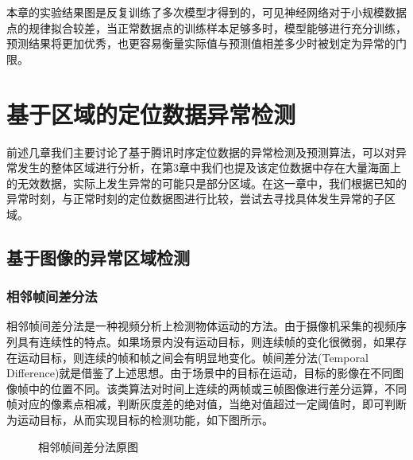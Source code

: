 \documentclass[a4paper,AutoFakeBold,oneside,12pt]{book}
\begin{document}
{{

	本章的实验结果图是反复训练了多次模型才得到的，可见神经网络对于小规模数据点的规律拟合较差，当正常数据点的训练样本足够多时，模型能够进行充分训练，预测结果将更加优秀，也更容易衡量实际值与预测值相差多少时被划定为异常的门限。

\chapter{基于区域的定位数据异常检测}
	前述几章我们主要讨论了基于腾讯时序定位数据的异常检测及预测算法，可以对异常发生的整体区域进行分析，在第3章中我们也提及该定位数据中存在大量海面上的无效数据，实际上发生异常的可能只是部分区域。在这一章中，我们根据已知的异常时刻，与正常时刻的定位数据图进行比较，尝试去寻找具体发生异常的子区域。

\section{基于图像的异常区域检测}
\subsection{相邻帧间差分法}
	相邻帧间差分法是一种视频分析上检测物体运动的方法。由于摄像机采集的视频序列具有连续性的特点。如果场景内没有运动目标，则连续帧的变化很微弱，如果存在运动目标，则连续的帧和帧之间会有明显地变化。帧间差分法(Temporal Difference)就是借鉴了上述思想。由于场景中的目标在运动，目标的影像在不同图像帧中的位置不同。该类算法对时间上连续的两帧或三帧图像进行差分运算，不同帧对应的像素点相减，判断灰度差的绝对值，当绝对值超过一定阈值时，即可判断为运动目标，从而实现目标的检测功能，如下图所示。

\begin{figure}[!htbp]
    \centering
    \quad %
   \caption{相邻帧间差分法原图} %
    \label{Fig:didi} %



\end{figure}}}
\end{document}
